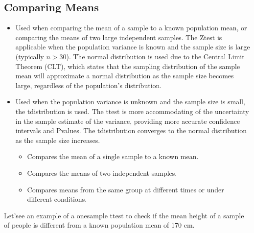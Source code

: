 \documentclass[letterpaper,10pt,english]{jupyterBook}
\begin{document}
\subsection{Comparing Means}
\label{\detokenize{notebooks/review_stats:comparing-means}}\begin{itemize}
\item {} 
\sphinxAtStartPar
{} Used when comparing the mean of a sample to a known population mean, or comparing the means of two large independent samples. The Z\sphinxhyphen{}test is applicable when the population variance is known and the sample size is large (typically \(n > 30\)). The normal distribution is used due to the Central Limit Theorem (CLT), which states that the sampling distribution of the sample mean will approximate a normal distribution as the sample size becomes large, regardless of the population’s distribution.

\item {} 
\sphinxAtStartPar
{} Used when the population variance is unknown and the sample size is small, the t\sphinxhyphen{}distribution is used. The t\sphinxhyphen{}test is more accommodating of the uncertainty in the sample estimate of the variance, providing more accurate confidence intervals and P\sphinxhyphen{}values. The t\sphinxhyphen{}distribution converges to the normal distribution as the sample size increases.
\begin{itemize}
\item {} 
\sphinxAtStartPar
{} Compares the mean of a single sample to a known mean.

\item {} 
\sphinxAtStartPar
{} Compares the means of two independent samples.

\item {} 
\sphinxAtStartPar
{} Compares means from the same group at different times or under different conditions.

\end{itemize}

\end{itemize}

\sphinxAtStartPar
Let’see an example of a one\sphinxhyphen{}sample t\sphinxhyphen{}test to check if the mean height of a sample of people is different from a known population mean of 170 cm.
\end{document}
